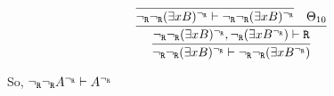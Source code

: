 \begin{enumerate}[(i)]
\begin{itemize}
            $$
                \infer{
                    \ngr\ngr(\exists x B)^\ngr \vdash \ngr\ngr(\exists x B^\ngr)
                }{
                    \infer{
                        \ngr\ngr(\exists x B)^\ngr, \ngr(\exists x B^\ngr) \vdash \R
                    }{
                        \infer{
                            \ngr\ngr(\exists x B)^\ngr \vdash \ngr\ngr(\exists x B)^\ngr
                        }{
                        }&
                        \Theta_{10}
                    }
                }
            $$
    \end{itemize}
    So, ${\neg_{\texttt{R}}}{\neg_{\texttt{R}}} A^{\neg_{\texttt{R}}}\vdash A^{\neg_{\texttt{R}}}$
\end{enumerate}